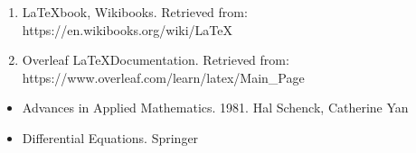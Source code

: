\documentclass[12pt, a4paper, reqno]{amsart}
\begin{document}
\begin{enumerate}
    \item \LaTeX book, Wikibooks. Retrieved from: https://en.wikibooks.org/wiki/LaTeX
    \item Overleaf \LaTeX Documentation. Retrieved from: \newline
        https://www.overleaf.com/learn/latex/Main\_Page
\end{enumerate}
\begin{itemize}
    \item Advances in Applied Mathematics. 1981. Hal Schenck, Catherine Yan
    \item Differential Equations. Springer
\end{itemize}
\end{document}
